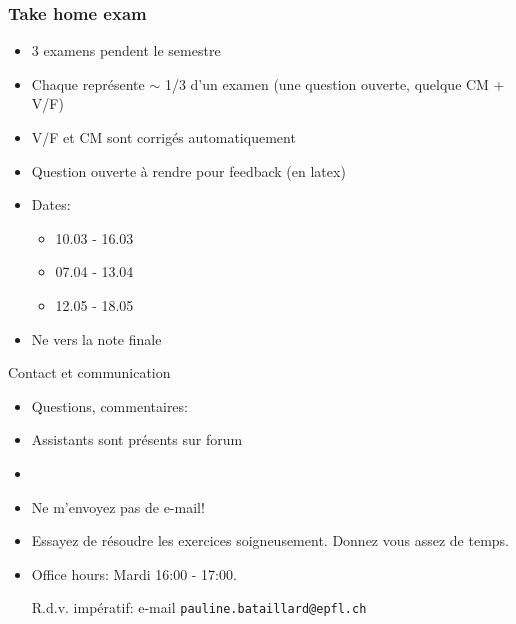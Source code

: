     \begin{frame}
     \frametitle{Take home exam} 
     \begin{itemize}
     \item 3 examens  pendent le semestre
     \item Chaque représente $∼$ 1/3 d'un examen (une question ouverte, quelque CM + V/F)
     \item V/F et CM sont corrigés automatiquement
     \item Question ouverte à rendre pour feedback (en latex)   
     \item Dates:
       \begin{itemize}
       \item 10.03 - 16.03
       \item 07.04 - 13.04
       \item 12.05 - 18.05
       \end{itemize}
     \item Ne  vers la note finale 
     \end{itemize}
   \end{frame}


   
   \begin{frame}{Contact et communication}

     \begin{itemize}
     \item Questions, commentaires: 
     \item Assistants sont présents sur forum 
     \item {} 
     \item Ne m'envoyez pas de  e-mail!
     \item Essayez de résoudre les exercices soigneusement. Donnez vous assez de temps.
     \item Office hours: Mardi 16:00 - 17:00.

       
      R.d.v. impératif: e-mail  {\tt pauline.bataillard@epfl.ch  }
     \end{itemize}
     
   \end{frame}


   

